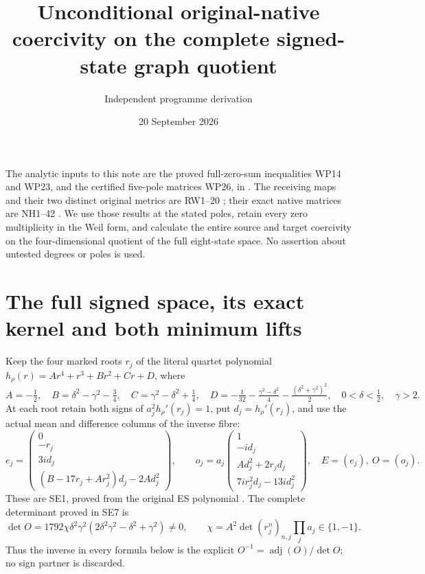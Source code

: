 \documentclass[11pt]{article}
\title{Unconditional original-native coercivity on the complete signed-state graph quotient}
\author{Independent programme derivation}
\date{20 September 2026}
\begin{document}
\maketitle
The analytic inputs to this note are the proved full-zero-sum
inequalities WP14 and WP23, and the certified five-pole matrices
WP26, in \cite{WP}. The receiving maps and their two distinct
original metrics are RW1--20 \cite{RW}; their exact native
matrices are NH1--42 \cite{NH}. We use those results at the
stated poles, retain every zero multiplicity in the Weil form,
and calculate the entire source and target coercivity on the
four-dimensional quotient of the full eight-state space.
No assertion about untested degrees or poles is used.

\section{The full signed space, its exact kernel and both minimum lifts}
Keep the four marked roots $r_j$ of the literal quartet polynomial
$h_\rho(r)=Ar^4+r^3+Br^2+Cr+D$, where
\[
 A=-\tfrac12,\quad B=\delta^2-\gamma^2-\tfrac34,\quad
 C=\gamma^2-\delta^2+\tfrac14,\quad
 D=-\tfrac1{32}-\tfrac{\gamma^2-\delta^2}{4}
                         -\tfrac{(\delta^2+\gamma^2)^2}{2},
 \quad0<\delta<\tfrac12,\quad\gamma>2.
\]
At each root retain both signs of $a_j^2h_\rho'(r_j)=1$,
put $d_j=h_\rho'(r_j)$, and use the actual mean and difference
columns of the inverse fibre:
\[
 e_j=\begin{pmatrix}0\\-r_j\\3id_j\\
 (B-17r_j+Ar_j^2)d_j-2Ad_j^2\end{pmatrix},\qquad
 o_j=a_j\begin{pmatrix}1\\-id_j\\Ad_j^2+2r_jd_j\\
 7ir_j^2d_j-13id_j^2\end{pmatrix},\quad E=(e_j),\ O=(o_j).
 \tag{NW1}
\]
These are SE1, proved from the original ES polynomial
\cite{ES,SE}. The complete determinant proved in SE7 is
\[
 \det O=1792\chi\delta^2\gamma^2
 (2\delta^2\gamma^2-\delta^2+\gamma^2)\ne0,
 \qquad \chi=A^2\det(r_j^n)_{n,j}\prod_ja_j\in\{1,-1\}.
\]
Thus the inverse in every formula below is the explicit
$O^{-1}=\operatorname{adj}(O)/\det O$; no sign partner is
discarded.
\end{document}
